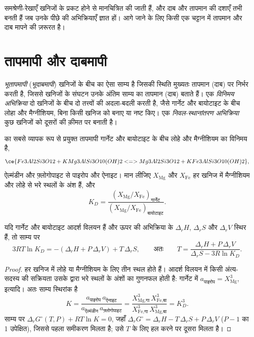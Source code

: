समश्रेणी-रेखाएँ खनिजों के प्रकट होने से मानचित्रित की जाती हैं, और दाब और तापमान की दशाएँ
तभी बनती हैं जब उनके पीछे की अभिक्रियाएँ ज्ञात हों। आगे जाने के लिए किसी एक चट्टान में
तापमान और दाब मापने की ज़रूरत है।

\section{तापमापी और दाबमापी}\label{sec:b2:pt-paths:thermobarometry}

\begin{definition}[भूतापमापी; भूदाबमापी; विनिमय अभिक्रिया; निवल-स्थानांतरण अभिक्रिया]\label{def:b2:pt-paths:thermobarometry}
\emph{भूतापमापी} (\emph{भूदाबमापी}) खनिजों के बीच
का ऐसा साम्य है जिसकी स्थिति मुख्यतः तापमान (दाब) पर निर्भर करती है, जिससे
खनिजों के संघटन उनके अंतिम साम्य का तापमान (दाब) बताते हैं। एक
\emph{विनिमय अभिक्रिया} दो खनिजों के बीच दो तत्त्वों की अदला-बदली करती है,
जैसे गार्नेट और बायोटाइट के बीच लोहा और मैग्नीशियम, बिना किसी खनिज को
बनाए या नष्ट किए। एक \emph{निवल-स्थानांतरण अभिक्रिया}
कुछ खनिजों को दूसरों की क़ीमत पर बनाती है।
\end{definition}

 का सबसे व्यापक रूप से प्रयुक्त तापमापी गार्नेट और बायोटाइट के बीच लोहे और मैग्नीशियम
का विनिमय है,
\[
\ce{Fe3Al2Si3O12 + KMg3AlSi3O10(OH)2 <=> Mg3Al2Si3O12 + KFe3AlSi3O10(OH)2},
\]
ऐल्मंडीन और फ़्लोगोपाइट से पाइरोप और ऐनाइट। मान लीजिए $X_{\text{Mg}}$ और $X_{\text{Fe}}$
हर खनिज में मैग्नीशियम और लोहे से भरे स्थलों के अंश हैं, और
\[
K_D = \frac{(X_{\text{Mg}}/X_{\text{Fe}})_{\text{गार्नेट}}}{(X_{\text{Mg}}/X_{\text{Fe}})_{\text{बायोटाइट}}}.
\]

\begin{proposition}[एक विनिमय साम्य]\label{prop:b2:pt-paths:exchange}
यदि गार्नेट और बायोटाइट आदर्श विलयन हैं और ऊपर की अभिक्रिया के $\Delta_r H$, $\Delta_r S$ और $\Delta_r V$
स्थिर हैं, तो साम्य पर
\[
3RT\ln K_D = -(\Delta_r H + P\,\Delta_r V) + T\,\Delta_r S,
\qquad\text{अतः}\qquad
T = \frac{\Delta_r H + P\,\Delta_r V}{\Delta_r S - 3R\ln K_D}.
\]
\end{proposition}

\begin{proof}
हर खनिज में लोहे या मैग्नीशियम के लिए तीन स्थल होते हैं। आदर्श विलयन में किसी
अंत्य-सदस्य की सक्रियता उसके द्वारा भरे स्थलों के अंशों का गुणनफल होती है: गार्नेट में $a_{\text{पाइरोप}} =
X_{\text{Mg}}^3$, इत्यादि। अतः साम्य स्थिरांक है
\[
K = \frac{a_{\text{पाइरोप}}\,a_{\text{ऐनाइट}}}{a_{\text{ऐल्मंडीन}}\,a_{\text{फ़्लोगोपाइट}}}
= \frac{X_{\text{Mg,गा}}^3\,X_{\text{Fe,बा}}^3}{X_{\text{Fe,गा}}^3\,X_{\text{Mg,बा}}^3} = K_D^3 .
\]
साम्य पर $\Delta_r G^\circ(T, P) + RT\ln K = 0$, जहाँ $\Delta_r G^\circ = \Delta_r H -
T\,\Delta_r S + P\,\Delta_r V$ ($P - 1$ का 1 उपेक्षित), जिससे पहला समीकरण मिलता है;
उसे $T$ के लिए हल करने पर दूसरा मिलता है।
\end{proof}

